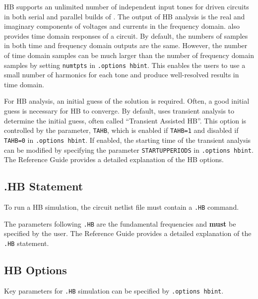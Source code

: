 HB supports an unlimited number of independent input tones for driven circuits in
both serial and parallel builds of \Xyce{}. The output of HB analysis is the real and 
imaginary components of voltages and currents in the frequency domain. \Xyce{} also 
provides time domain responses of a circuit. By default, the numbers of samples in 
both time and frequency domain outputs are the same.  However, the number of time 
domain samples can be much larger than the number of frequency domain  samples by 
setting \verb|numtpts| in \verb|.options hbint|. This enables the users to use a 
small number of harmonics for each tone and produce well-resolved results in time 
domain.

For HB analysis, an initial guess of the solution is required. Often, a
good initial guess is necessary for HB to converge. By default, \Xyce{} uses
transient analysis to determine the initial guess, often called ``Transient Assisted HB''.  
This option is controlled by the parameter, \verb|TAHB|, which is enabled if \verb|TAHB=1|
and disabled if \verb|TAHB=0| in \verb|.options hbint|. If enabled, the starting time of 
the transient analysis can be modified by specifying the parameter \verb|STARTUPPERIODS| 
in \verb|.options hbint|. The \Xyce{} Reference Guide\ReferenceGuide{} provides a
detailed explanation of the HB options. 

\subsection{.HB Statement}

To run a HB simulation, the circuit netlist file must contain a \verb|.HB| command.


The parameters following \verb|.HB| are the fundamental frequencies and {\bf must} be
specified by the user. The \Xyce{} Reference Guide\ReferenceGuide{} provides a detailed 
explanation of the \verb|.HB| statement.


\subsection{HB Options}

Key parameters for \verb|.HB| simulation can be specified by \verb|.options hbint|.
 

